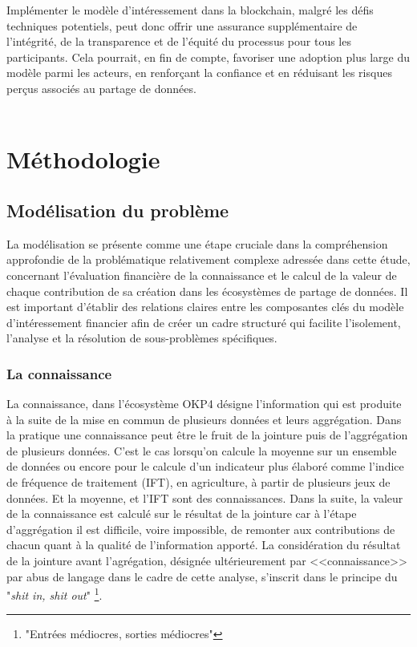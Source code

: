 Implémenter le modèle d'intéressement dans la blockchain, malgré les défis techniques potentiels, peut donc offrir une assurance supplémentaire de l'intégrité, de la transparence et de l'équité du processus pour tous les participants. Cela pourrait, en fin de compte, favoriser une adoption plus large du modèle parmi les acteurs, en renforçant la confiance et en réduisant les risques perçus associés au partage de données.\\

\\

\section{Méthodologie}\label{sec:methodologie}


\subsection{Modélisation du problème} \label{subsec:model_pb}

La modélisation se présente comme une étape cruciale dans la compréhension approfondie de la problématique relativement complexe adressée dans cette étude, concernant l'évaluation financière de la connaissance et le calcul de la valeur de chaque contribution de sa création dans les écosystèmes de partage de données. Il est important d'établir des relations claires entre les composantes clés du modèle d'intéressement financier afin de créer un cadre structuré qui facilite l'isolement, l'analyse et la résolution de sous-problèmes spécifiques.

\subsubsection{La connaissance} \label{subsubsec:connaissance}

La connaissance, dans l'écosystème OKP4 désigne l'information qui est produite à la suite de la mise en commun de plusieurs données et leurs aggrégation. Dans la pratique une connaissance peut être le fruit de la jointure puis de l'aggrégation de plusieurs données. C'est le cas lorsqu'on calcule la moyenne sur un ensemble de données ou encore pour le calcule d'un indicateur plus élaboré comme l'indice de fréquence de traitement (IFT), en agriculture, à partir de plusieurs jeux de données. Et la moyenne, et l'IFT sont des connaissances.  Dans la suite, la valeur de la connaissance est calculé sur le résultat de la jointure car à l'étape d'aggrégation il est difficile, voire impossible, de remonter aux contributions de chacun quant à la qualité de l'information apporté. La considération du résultat de la jointure avant l'agrégation, désignée ultérieurement par <<connaissance>> par abus de langage dans le cadre de cette analyse, s'inscrit dans le principe du "\textit{shit in, shit out}" \footnote{"Entrées médiocres, sorties médiocres"}.

